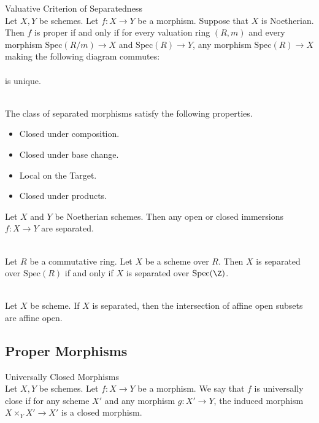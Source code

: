 \documentclass[a4paper]{article}
\begin{document}
\begin{thm}{Valuative Criterion of Separatedness}{}\\
Let $X,Y$ be schemes. Let $f:X\to Y$ be a morphism. Suppose that $X$ is Noetherian. Then $f$ is proper if and only if for every valuation ring $(R,m)$ and every morphism $\text{Spec}(R/m)\to X$ and $\text{Spec}(R)\to Y$, any morphism $\text{Spec}(R)\to X$ making the following diagram commutes: \\
 \\
is unique. 
\end{thm}

\begin{lmm}{}{}\\
The class of separated morphisms satisfy the following properties. 
\begin{itemize}
\item Closed under composition. 
\item Closed under base change. 
\item Local on the Target. 
\item Closed under products. 
\end{itemize}
\end{lmm}

\begin{prp}{}{} Let $X$ and $Y$ be Noetherian schemes. Then any open or closed immersions $f:X\to Y$ are separated. 
\end{prp}

\begin{lmm}{}{}\\
Let $R$ be a commutative ring. Let $X$ be a scheme over $R$. Then $X$ is separated over $\text{Spec}(R)$ if and only if $X$ is separated over $\text{Spec}(\Z)$. 
\end{lmm}

\begin{lmm}{}{}\\
Let $X$ be scheme. If $X$ is separated, then the intersection of affine open subsets are affine open. 
\end{lmm}

\subsection{Proper Morphisms}
\begin{defn}{Universally Closed Morphisms}{}\\
Let $X,Y$ be schemes. Let $f:X\to Y$ be a morphism. We say that $f$ is universally close if for any scheme $X'$ and any morphism $g:X'\to Y$, the induced morphism $X\times_YX'\to X'$ is a closed morphism. 
\end{defn}
\end{document}
